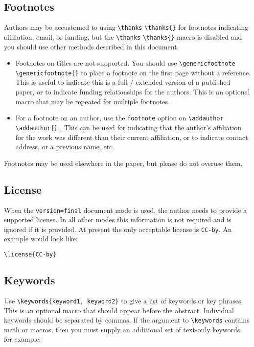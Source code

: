 \documentclass{iacrcc}
\newcommand{\cmd}[2][]{%
  \def\FirstArg{#1}
  \ifx\FirstArg\empty
    \texttt{\textbackslash{}#2}%
  \else
    \texttt{\textbackslash{}#2\{#1\}}%
  \fi
}
\begin{document}
\subsection{Footnotes}\label{footnotes}
Authors may be accustomed to using \cmd{thanks} for footnotes
indicating affiliation, email, or funding, but the
\cmd{thanks} macro is disabled and you should use other methods described
in this document.
\begin{itemize}
\item Footnotes on titles are not supported. You should use 
  \cmd{genericfootnote} to place a
  footnote on the first page without a reference. This is useful to
  indicate this is a full / extended version of a published paper, or to
  indicate funding relationships for the authors.  This is an optional
  macro that may be repeated for multiple footnotes.
\item For a footnote on an author, use the \texttt{footnote} option
  on \cmd{addauthor}. This can be used for indicating that the author's
  affiliation for the work was different than their current affiliation,
  or to indicate contact address, or a previous name, etc.
\end{itemize}

Footnotes may be used elsewhere in the paper, but please do not
overuse them.

\subsection{License}
When the \texttt{version=final} document mode is used, the author needs
to provide a supported license.  In all other modes this information
is not required and is ignored if it is provided.  At present the only
acceptable license is \texttt{CC-by}.  An example would look like:

\begin{verbatim}
\license{CC-by}
\end{verbatim}

\subsection{Keywords}
Use \texttt{\textbackslash keywords\{keyword1, keyword2\}} to give a
list of keywords or key phrases. This is an optional macro that should
appear before the abstract.  Individual keywords should be separated
by commas. If the argument to \texttt{\textbackslash keywords}
contains math or macros, then you must supply an additional set of
text-only keywords; for example:
\end{document}
